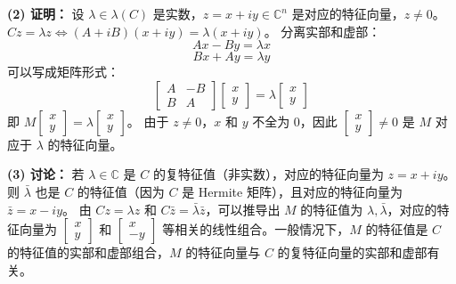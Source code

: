 \documentclass{article}
\begin{document}
\textbf{(2) 证明：}
设 \(\lambda \in \lambda(C)\) 是实数，\(z = x + iy \in \mathbb{C}^n\) 是对应的特征向量，\(z \neq 0\)。
\(Cz = \lambda z \iff (A + iB)(x + iy) = \lambda(x + iy)\)。
分离实部和虚部：
\[
 Ax - By = \lambda x 
\]
\[
 Bx + Ay = \lambda y 
\]
可以写成矩阵形式：
\[
 \begin{bmatrix} A & -B \\ B & A \end{bmatrix} \begin{bmatrix} x \\ y \end{bmatrix} = \lambda \begin{bmatrix} x \\ y \end{bmatrix} 
\]
即 \(M \begin{bmatrix} x \\ y \end{bmatrix} = \lambda \begin{bmatrix} x \\ y \end{bmatrix}\)。
由于 \(z \neq 0\)，\(x\) 和 \(y\) 不全为 0，因此 \(\begin{bmatrix} x \\ y \end{bmatrix} \neq 0\) 是 \(M\) 对应于 \(\lambda\) 的特征向量。

\textbf{(3) 讨论：}
若 \(\lambda \in \mathbb{C}\) 是 \(C\) 的复特征值（非实数），对应的特征向量为 \(z = x + iy\)。
则 \(\bar{\lambda}\) 也是 \(C\) 的特征值（因为 \(C\) 是 Hermite 矩阵），且对应的特征向量为 \(\bar{z} = x - iy\)。
由 \(Cz = \lambda z\) 和 \(C\bar{z} = \bar{\lambda} \bar{z}\)，可以推导出 \(M\) 的特征值为 \(\lambda, \bar{\lambda}\)，对应的特征向量为 \(\begin{bmatrix} x \\ y \end{bmatrix}\) 和 \(\begin{bmatrix} x \\ -y \end{bmatrix}\) 等相关的线性组合。一般情况下，\(M\) 的特征值是 \(C\) 的特征值的实部和虚部组合，\(M\) 的特征向量与 \(C\) 的复特征向量的实部和虚部有关。
\end{document}
